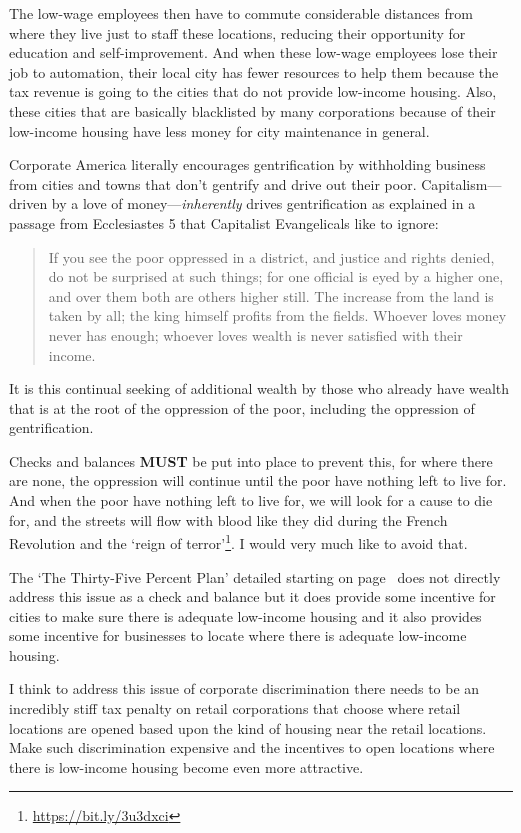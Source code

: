 The low-wage employees then have to commute considerable distances from where they live just to staff these locations, reducing their opportunity for education and self-improvement. And when these low-wage employees lose their job to automation, their local city has fewer resources to help them because the tax revenue is going to the cities that do not provide low-income housing. Also, these cities that are basically blacklisted by many corporations because of their low-income housing have less money for city maintenance in general.

Corporate America literally encourages gentrification by withholding business from cities and towns that don't gentrify and drive out their poor. Capitalism---driven by a love of money---\emph{inherently} drives gentrification as explained in a passage from Ecclesiastes 5 that Capitalist Evangelicals like to ignore:

\begin{quote}
If you see the poor oppressed in a district, and justice and rights denied, do not be surprised at such things; for one official is eyed by a higher one, and over them both are others higher still. The increase from the land is taken by all; the king himself profits from the fields. Whoever loves money never has enough; whoever loves wealth is never satisfied with their income.
\end{quote}

It is this continual seeking of additional wealth by those who already have wealth that is at the root of the oppression of the poor, including the oppression of gentrification.

Checks and balances \textbf{MUST} be put into place to prevent this, for where there are none, the oppression will continue until the poor have nothing left to live for. And when the poor have nothing left to live for, we will look for a cause to die for, and the streets will flow with blood like they did during the French Revolution and the `reign of terror'\footnote{\url{https://bit.ly/3u3dxci}}. I would very much like to avoid that.

The `The Thirty-Five Percent Plan' detailed starting on page~\pageref{thirtyfive} does not directly address this issue as a check and balance but it does provide some incentive for cities to make sure there is adequate low-income housing and it also provides some incentive for businesses to locate where there is adequate low-income housing.

I think to address this issue of corporate discrimination there needs to be an incredibly stiff tax penalty on retail corporations that choose where retail locations are opened based upon the kind of housing near the retail locations. Make such discrimination expensive and the incentives to open locations where there is low-income housing become even more attractive.

